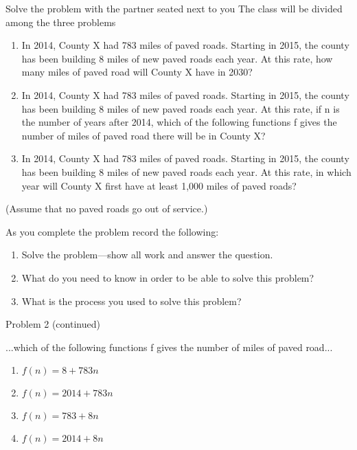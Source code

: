\begin{frame}{Solve the problem with the partner seated next to you}
  {The class will be divided among the three problems}
  \begin{enumerate}
    \item In 2014, County X had 783 miles of paved roads. Starting in 2015, the county has
    been building 8 miles of new paved roads each year. At this rate, how many miles
    of paved road will County X have in 2030?
    \item In 2014, County X had 783 miles of paved roads. Starting in 2015, the county has
    been building 8 miles of new paved roads each year. At this rate, if n is the number
    of years after 2014, which of the following functions f gives the number of miles
    of paved road there will be in County X?
    \item In 2014, County X had 783 miles of paved roads. Starting in 2015, the county has
    been building 8 miles of new paved roads each year. At this rate, in which year will
    County X first have at least 1,000 miles of paved roads?
  \end{enumerate}
  (Assume that no paved roads go out of service.)
  \end{frame}

\begin{frame}{As you complete the problem record the following:}  
  \begin{enumerate}
    \item Solve the problem—show all work and answer the question.
    \item What do you need to know in order to be able to solve this problem?
    \item What is the process you used to solve this problem?
  \end{enumerate} \vspace{1cm}
  Problem 2 (continued) \par 
  ...which of the following functions f gives the number of miles of paved road...
  \begin{enumerate}
    \item $f(n) = 8 + 783n$
    \item $f(n) = 2014 + 783n$
    \item $f(n) = 783 + 8n$
    \item $f(n) = 2014 + 8n$
  \end{enumerate}
  \end{frame}

